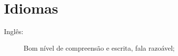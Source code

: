 \documentclass[pdftex, a4paper, 11pt]{article}
\begin{document}
\section*{Idiomas}
\begin{description}
\item[Inglês:] Bom nível de compreensão e escrita, fala razoável;
\end{description}


\vfill


\vspace{1cm}

\end{document}
